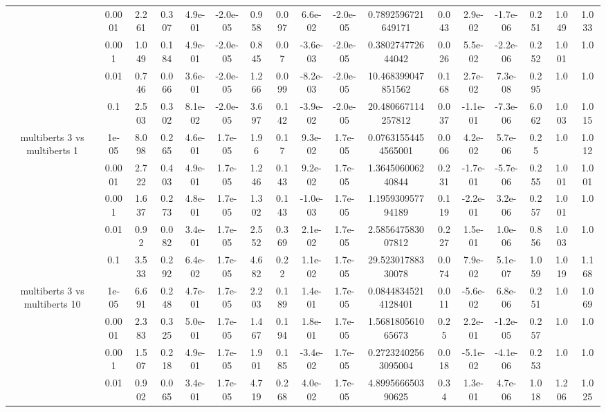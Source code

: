 \begin{tabular}{|c|c|c|c|c|c|c|c|c|c|c|c|c|c|c|c|c|}
 & 0.0001 & 2.261 & 0.307 & 4.9e-01 & -2.0e-05 & 0.958 & 0.097 & 6.6e-02 & -2.0e-05 & 0.7892596721649171 & 0.043 & 2.9e-02 & -1.7e-06 & 0.251 & 1.049 & 1.033 \\
 & 0.001 & 1.049 & 0.184 & 4.9e-01 & -2.0e-05 & 0.845 & 0.07 & -3.6e-03 & -2.0e-05 & 0.380274772644042 & 0.026 & 5.5e-02 & -2.2e-06 & 0.252 & 1.001 & 1.0 \\
 & 0.01 & 0.746 & 0.066 & 3.6e-01 & -2.0e-05 & 1.266 & 0.099 & -8.2e-03 & -2.0e-05 & 10.468399047851562 & 0.168 & 2.7e-02 & 7.3e-08 & 0.295 & 1.0 & 1.0 \\
 & 0.1 & 2.503 & 0.302 & 8.1e-02 & -2.0e-05 & 3.697 & 0.142 & -3.9e-02 & -2.0e-05 & 20.480667114257812 & 0.037 & -1.1e-01 & -7.3e-06 & 6.062 & 1.003 & 1.015 \\
\hline
\multirow{5}{*}{multiberts 3 vs multiberts 1} & 1e-05 & 8.098 & 0.265 & 4.6e-01 & 1.7e-05 & 1.96 & 0.17 & 9.3e-02 & 1.7e-05 & 0.07631554454565001 & 0.006 & 4.2e-02 & 5.7e-06 & 0.25 & 1.0 & 1.012 \\
 & 0.0001 & 2.722 & 0.403 & 4.9e-01 & 1.7e-05 & 1.246 & 0.143 & 9.2e-02 & 1.7e-05 & 1.364506006240844 & 0.231 & -1.7e-01 & -5.7e-06 & 0.255 & 1.001 & 1.001 \\
 & 0.001 & 1.637 & 0.273 & 4.8e-01 & 1.7e-05 & 1.302 & 0.143 & -1.0e-03 & 1.7e-05 & 1.195930957794189 & 0.119 & -2.2e-01 & 3.2e-06 & 0.257 & 1.001 & 1.0 \\
 & 0.01 & 0.92 & 0.082 & 3.4e-01 & 1.7e-05 & 2.552 & 0.369 & 2.1e-02 & 1.7e-05 & 2.585647583007812 & 0.227 & 1.5e-01 & 1.0e-06 & 0.856 & 1.003 & 1.0 \\
 & 0.1 & 3.533 & 0.292 & 6.4e-02 & 1.7e-05 & 4.682 & 0.22 & 1.1e-02 & 1.7e-05 & 29.52301788330078 & 0.074 & 7.9e-02 & 5.1e-07 & 1.059 & 1.019 & 1.168 \\
\hline
\multirow{5}{*}{multiberts 3 vs multiberts 10} & 1e-05 & 6.691 & 0.248 & 4.7e-01 & 1.7e-05 & 2.203 & 0.189 & 1.4e-01 & 1.7e-05 & 0.08448345214128401 & 0.011 & -5.6e-02 & 6.8e-06 & 0.251 & 1.0 & 1.069 \\
 & 0.0001 & 2.383 & 0.325 & 5.0e-01 & 1.7e-05 & 1.467 & 0.194 & 1.8e-01 & 1.7e-05 & 1.568180561065673 & 0.25 & 2.2e-01 & -1.2e-05 & 0.257 & 1.0 & 1.0 \\
 & 0.001 & 1.507 & 0.218 & 4.9e-01 & 1.7e-05 & 1.901 & 0.185 & -3.4e-02 & 1.7e-05 & 0.27232402563095004 & 0.018 & -5.1e-02 & -4.1e-06 & 0.253 & 1.0 & 1.0 \\
 & 0.01 & 0.902 & 0.065 & 3.4e-01 & 1.7e-05 & 4.719 & 0.268 & 4.0e-02 & 1.7e-05 & 4.899566650390625 & 0.34 & 1.3e-01 & 4.7e-06 & 1.018 & 1.206 & 1.025 \\

\end{tabular}
